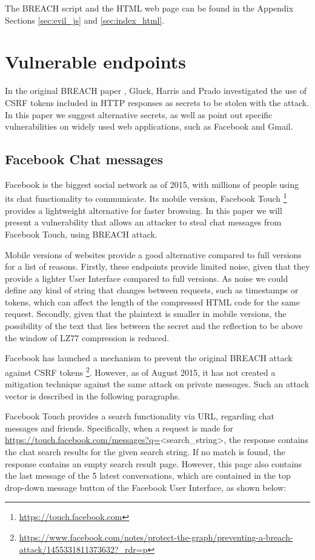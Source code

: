 The BREACH script and the HTML web page can be found in the Appendix Sections
\ref{sec:evil_js} and \ref{sec:index_html}.

\section{Vulnerable endpoints}\label{sec:vulnerabilities}

In the original BREACH paper \cite{breach}, Gluck, Harris and Prado investigated
the use of CSRF tokens included in HTTP responses as secrets to be stolen with
the attack. In this paper we suggest alternative secrets, as well as point out
specific vulnerabilities on widely used web applications, such as Facebook and
Gmail.

\subsection{Facebook Chat messages}\label{subsec:fb}

Facebook is the biggest social network as of 2015, with millions of people using
its chat functionality to communicate. Its mobile version, Facebook Touch
\footnote{\url{https://touch.facebook.com}} provides a lightweight alternative for
faster browsing. In this paper we will present a vulnerability that allows an
attacker to steal chat messages from Facebook Touch, using BREACH attack.

Mobile versions of websites provide a good alternative compared to full
versions for a list of reasons. Firstly, these endpoints provide limited noise,
given that they provide a lighter User Interface compared to full versions. As
noise we could define any kind of string that changes between requests, such as
timestamps or tokens, which can affect the length of the compressed HTML code
for the same request. Secondly, given that the plaintext is smaller in mobile
versions, the possibility of the text that lies between the secret and the
reflection to be above the window of LZ77 compression is reduced.

Facebook has launched a mechanism to prevent the original BREACH attack against
CSRF tokens
\footnote{\url{https://www.facebook.com/notes/protect-the-graph/preventing-a-breach-attack/1455331811373632?_rdr=p}}.
However, as of August 2015, it has not created a mitigation technique against
the same attack on private messages. Such an attack vector is described in the
following paragraphs.

Facebook Touch provides a search functionality via URL, regarding chat messages
and friends. Specifically, when a request is made for
\url{https://touch.facebook.com/messages?q=}<search\_string>, the response
contains the chat search results for the given search string. If no match is
found, the response contains an empty search result page. However, this page
also contains the last message of the 5 latest conversations, which are
contained in the top drop-down message button of the Facebook User Interface, as
shown below:

